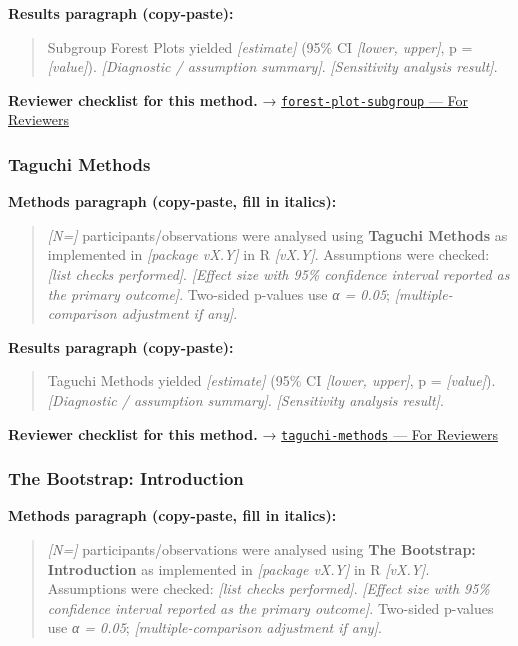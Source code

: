 \documentclass[
]{article}
\begin{document}
\textbf{Results paragraph (copy-paste):}

\begin{quote}
Subgroup Forest Plots yielded \emph{{[}estimate{]}} (95\% CI
\emph{{[}lower, upper{]}}, p = \emph{{[}value{]}}). \emph{{[}Diagnostic
/ assumption summary{]}}. \emph{{[}Sensitivity analysis result{]}}.
\end{quote}

\textbf{Reviewer checklist for this method.} →
\href{../chapters/14-clinical/forest-plot-subgroup.Rmd\#for-reviewers}{\texttt{forest-plot-subgroup}
--- For Reviewers}

\subsubsection{Taguchi Methods}\label{taguchi-methods}

\textbf{Methods paragraph (copy-paste, fill in italics):}

\begin{quote}
\emph{{[}N={]}} participants/observations were analysed using
\textbf{Taguchi Methods} as implemented in \emph{{[}package vX.Y{]}} in
R \emph{{[}vX.Y{]}}. Assumptions were checked: \emph{{[}list checks
performed{]}}. \emph{{[}Effect size with 95\% confidence interval
reported as the primary outcome{]}}. Two-sided p-values use \emph{α =
0.05}; \emph{{[}multiple-comparison adjustment if any{]}}.
\end{quote}

\textbf{Results paragraph (copy-paste):}

\begin{quote}
Taguchi Methods yielded \emph{{[}estimate{]}} (95\% CI \emph{{[}lower,
upper{]}}, p = \emph{{[}value{]}}). \emph{{[}Diagnostic / assumption
summary{]}}. \emph{{[}Sensitivity analysis result{]}}.
\end{quote}

\textbf{Reviewer checklist for this method.} →
\href{../chapters/16-design/taguchi-methods.Rmd\#for-reviewers}{\texttt{taguchi-methods}
--- For Reviewers}

\subsubsection{The Bootstrap:
Introduction}\label{the-bootstrap-introduction}

\textbf{Methods paragraph (copy-paste, fill in italics):}

\begin{quote}
\emph{{[}N={]}} participants/observations were analysed using
\textbf{The Bootstrap: Introduction} as implemented in \emph{{[}package
vX.Y{]}} in R \emph{{[}vX.Y{]}}. Assumptions were checked: \emph{{[}list
checks performed{]}}. \emph{{[}Effect size with 95\% confidence interval
reported as the primary outcome{]}}. Two-sided p-values use \emph{α =
0.05}; \emph{{[}multiple-comparison adjustment if any{]}}.
\end{quote}
\end{document}
